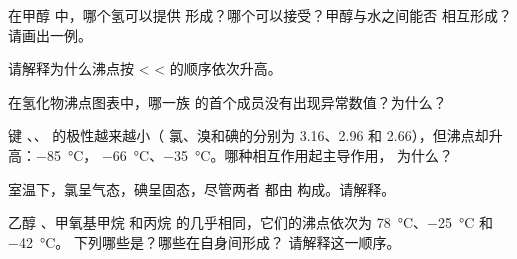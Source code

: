 \begin{exercise}[$\star\star$]\label{exo:g11:polarity-and-cohesion:7}
在甲醇  中，哪个氢可以提供
形成？哪个可以接受？甲醇与水之间能否
相互形成？请画出一例。
\end{exercise}

\begin{exercise}[$\star\star$]\label{exo:g11:polarity-and-cohesion:8}
请解释为什么沸点按  <
 <  的顺序依次升高。
\end{exercise}

\begin{exercise}[$\star\star$]\label{exo:g11:polarity-and-cohesion:9}
在氢化物沸点图表中，哪一族
的首个成员没有出现异常数值？为什么？
\end{exercise}

\begin{exercise}[$\star\star$]\label{exo:g11:polarity-and-cohesion:10}
键 、、 的极性越来越小（
氯、溴和碘的分别为 3.16、2.96
和 2.66），但沸点却升高：\qty{-85}{\celsius}，
\qty{-66}{\celsius}、\qty{-35}{\celsius}。哪种相互作用起主导作用，
为什么？
\end{exercise}

\begin{exercise}[$\star\star$]\label{exo:g11:polarity-and-cohesion:11}
室温下，氯呈气态，碘呈固态，尽管两者
都由  构成。请解释。
\end{exercise}

\begin{exercise}[$\star\star\star$]\label{exo:g11:polarity-and-cohesion:12}
乙醇 、甲氧基甲烷  和丙烷
 的几乎相同，它们的沸点依次为
\qty{78}{\celsius}、\qty{-25}{\celsius} 和 \qty{-42}{\celsius}。
下列哪些是？哪些在自身间形成？
请解释这一顺序。
\end{exercise}

